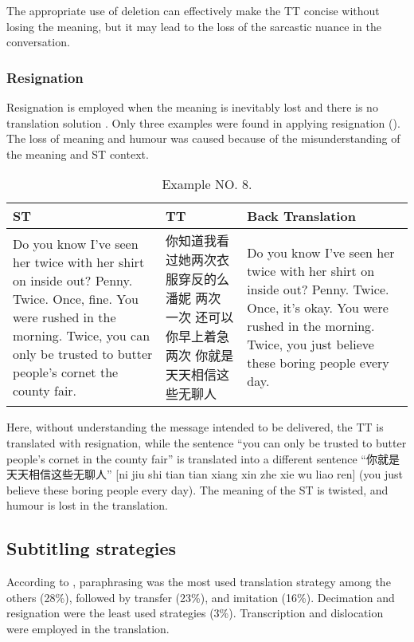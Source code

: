 \documentclass[english]{textolivre}
\begin{document}
The appropriate use of deletion can effectively make the TT concise without losing the meaning, but it may lead to the loss of the sarcastic nuance in the conversation. 

\subsubsection{Resignation}

Resignation is employed when the meaning is inevitably lost and there is no translation solution \cite{gottlieb_1992}. Only three examples were found in applying resignation (). The loss of meaning and humour was caused because of the misunderstanding of the meaning and ST context.  

\begin{table}[htpb]
\caption{Example NO. 8.}
\label{tbl08}
\begin{tabularx}{\linewidth}{XXX}
\toprule 
ST  & TT & Back Translation \\ 
\midrule
Do you know I've seen her twice with her shirt on inside out? 
Penny. Twice. 
Once, fine. You were rushed in the morning. 
Twice, you can only be trusted to butter people's cornet the county fair.  & 你知道我看过她两次衣服穿反的么潘妮 两次 
一次 还可以 你早上着急 
两次 你就是天天相信这些无聊人  & Do you know I've seen her twice with her shirt on inside out? Penny. Twice. 
Once, it's okay.  
You were rushed in the morning. Twice, you just believe these boring people every day. \\ 
\bottomrule
\end{tabularx}
\end{table}

Here, without understanding the message intended to be delivered, the TT is translated with resignation, while the sentence “you can only be trusted to butter people's cornet in the county fair” is translated into a different sentence “你就是天天相信这些无聊人” [ni jiu shi tian tian xiang xin zhe xie wu liao ren] (you just believe these boring people every day). The meaning of the ST is twisted, and humour is lost in the translation. 

\subsection{Subtitling strategies}
According to , paraphrasing was the most used translation strategy among the others (28\%), followed by transfer (23\%), and imitation (16\%). Decimation and resignation were the least used strategies (3\%). Transcription and dislocation were employed in the translation. 
\end{document}
